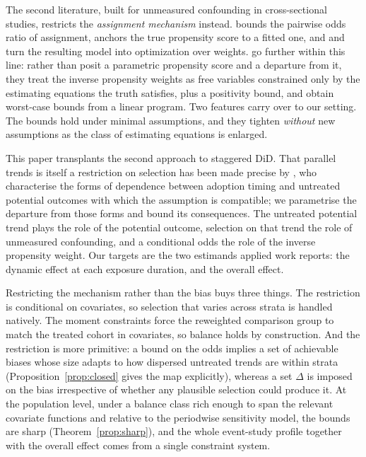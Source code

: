 \documentclass[12pt]{article}
\theoremstyle{remark}
\begin{document}
The second literature, built for unmeasured confounding in cross-sectional studies,
restricts the \emph{assignment mechanism} instead. \citet{rosenbaum1983assessing} bounds
the pairwise odds ratio of assignment, \citet{tan2006distributional} anchors the true
propensity score to a fitted one, and \citet{zhao2019sensitivity} and
\citet{dorn2023sharp} turn the resulting model into optimization over weights.
\citet{tang2025simple} go further within this line: rather than posit a parametric
propensity score and a departure from it, they treat the inverse propensity weights as
free variables constrained only by the estimating equations the truth satisfies, plus a
positivity bound, and obtain worst-case bounds from a linear program. Two features carry
over to our setting. The bounds hold under minimal assumptions, and they tighten
\emph{without} new assumptions as the class of estimating equations is enlarged.

This paper transplants the second approach to staggered DiD. That parallel trends is
itself a restriction on selection has been made precise by \citet{ghanem2022selection},
who characterise the forms of dependence between adoption timing and untreated potential
outcomes with which the assumption is compatible; we parametrise the departure from those
forms and bound its consequences. The untreated potential trend plays the role of the
potential outcome, selection on that trend the role of unmeasured confounding, and a
conditional odds the role of the inverse propensity weight. Our targets are the two
estimands applied work reports: the dynamic effect at each exposure duration, and the
overall effect.

Restricting the mechanism rather than the bias buys three things. The restriction is
conditional on covariates, so selection that varies across strata is handled natively. The
moment constraints force the reweighted comparison group to match the treated cohort in
covariates, so balance holds by construction. And the restriction is more primitive: a
bound on the odds implies a set of achievable biases whose size adapts to how dispersed
untreated trends are within strata (Proposition~\ref{prop:closed} gives the map
explicitly), whereas a set $\Delta$ is imposed on the bias irrespective of whether any
plausible selection could produce it. At the population level, under a balance class rich
enough to span the relevant covariate functions and relative to the periodwise sensitivity
model, the bounds are sharp (Theorem~\ref{prop:sharp}), and the whole event-study profile
together with the overall effect comes from a single constraint system.
\end{document}
